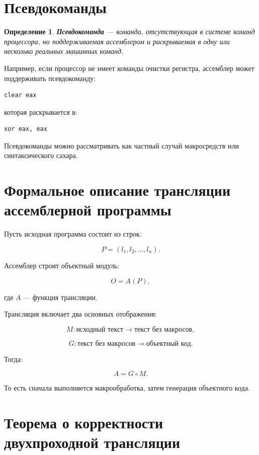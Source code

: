 \documentclass[12pt,a4paper]{article}
\newtheorem{definition}{Определение}
\begin{document}
\section{Псевдокоманды}

\begin{definition}
\textbf{Псевдокоманда} --- команда, отсутствующая в системе команд процессора, но поддерживаемая ассемблером и раскрываемая в одну или несколько реальных машинных команд.
\end{definition}

Например, если процессор не имеет команды очистки регистра, ассемблер может поддерживать псевдокоманду:

\begin{lstlisting}
clear eax
\end{lstlisting}

которая раскрывается в:

\begin{lstlisting}
xor eax, eax
\end{lstlisting}

Псевдокоманды можно рассматривать как частный случай макросредств или синтаксического сахара.

\section{Формальное описание трансляции ассемблерной программы}

Пусть исходная программа состоит из строк:

\[
P = (l_1, l_2, \ldots, l_n).
\]

Ассемблер строит объектный модуль:

\[
O = A(P),
\]

где $A$ --- функция трансляции.

Трансляция включает два основных отображения:

\[
M: \text{исходный текст} \to \text{текст без макросов},
\]

\[
G: \text{текст без макросов} \to \text{объектный код}.
\]

Тогда:

\[
A = G \circ M.
\]

То есть сначала выполняется макрообработка, затем генерация объектного кода.

\section{Теорема о корректности двухпроходной трансляции}
\end{document}
